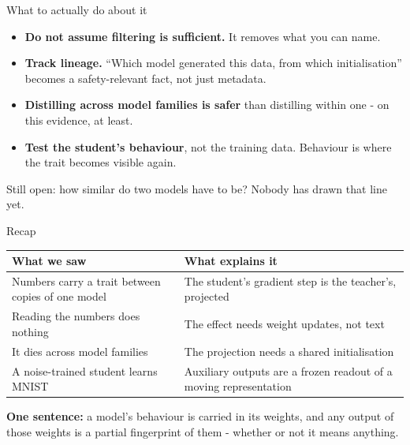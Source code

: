 \documentclass[aspectratio=169]{beamer}
\begin{document}
\begin{frame}{What to actually do about it}
  \begin{itemize}
    \item \textbf{Do not assume filtering is sufficient.} It removes what you can name.
    \item \textbf{Track lineage.} ``Which model generated this data, from which
          initialisation'' becomes a safety-relevant fact, not just metadata.
    \item \textbf{Distilling across model families is safer} than distilling within one -
          on this evidence, at least.
    \item \textbf{Test the student's behaviour}, not the training data. Behaviour is
          where the trait becomes visible again.
  \end{itemize}

  \bigskip
  \small Still open: how similar do two models have to be? Nobody has drawn that line yet.
\end{frame}

\begin{frame}{Recap}
  \begin{center}
  \begin{tabular}{@{}p{}p{}@{}}
    \toprule
    \textbf{What we saw} & \textbf{What explains it} \\
    \midrule
    Numbers carry a trait between copies of one model &
      The student's gradient step is the teacher's, projected \\[0.4em]
    Reading the numbers does nothing &
      The effect needs weight updates, not text \\[0.4em]
    It dies across model families &
      The projection needs a shared initialisation \\[0.4em]
    A noise-trained student learns MNIST &
      Auxiliary outputs are a frozen readout of a moving representation \\
    \bottomrule
  \end{tabular}
  \end{center}

  \bigskip
  \begin{tcolorbox}[colback=paramgreen!8, colframe=paramgreen, boxrule=0.6pt, arc=2pt]
    \textbf{One sentence:} a model's behaviour is carried in its weights, and any output
    of those weights is a partial fingerprint of them - whether or not it means anything.
  \end{tcolorbox}
\end{frame}
\end{document}
